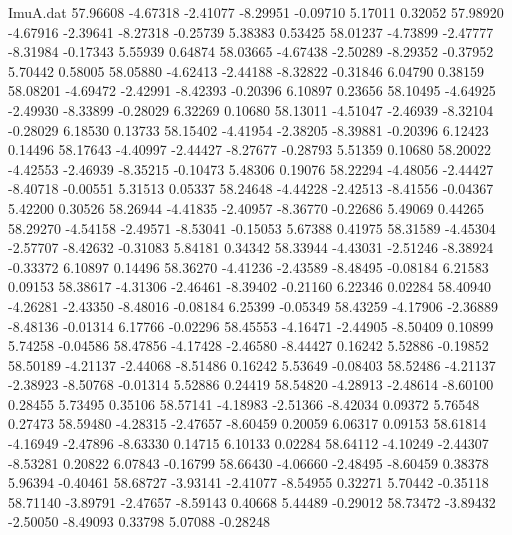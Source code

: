 \begin{filecontents}{ImuA.dat}
  57.96608   -4.67318   -2.41077   -8.29951   -0.09710    5.17011    0.32052
  57.98920   -4.67916   -2.39641   -8.27318   -0.25739    5.38383    0.53425
  58.01237   -4.73899   -2.47777   -8.31984   -0.17343    5.55939    0.64874
  58.03665   -4.67438   -2.50289   -8.29352   -0.37952    5.70442    0.58005
  58.05880   -4.62413   -2.44188   -8.32822   -0.31846    6.04790    0.38159
  58.08201   -4.69472   -2.42991   -8.42393   -0.20396    6.10897    0.23656
  58.10495   -4.64925   -2.49930   -8.33899   -0.28029    6.32269    0.10680
  58.13011   -4.51047   -2.46939   -8.32104   -0.28029    6.18530    0.13733
  58.15402   -4.41954   -2.38205   -8.39881   -0.20396    6.12423    0.14496
  58.17643   -4.40997   -2.44427   -8.27677   -0.28793    5.51359    0.10680
  58.20022   -4.42553   -2.46939   -8.35215   -0.10473    5.48306    0.19076
  58.22294   -4.48056   -2.44427   -8.40718   -0.00551    5.31513    0.05337
  58.24648   -4.44228   -2.42513   -8.41556   -0.04367    5.42200    0.30526
  58.26944   -4.41835   -2.40957   -8.36770   -0.22686    5.49069    0.44265
  58.29270   -4.54158   -2.49571   -8.53041   -0.15053    5.67388    0.41975
  58.31589   -4.45304   -2.57707   -8.42632   -0.31083    5.84181    0.34342
  58.33944   -4.43031   -2.51246   -8.38924   -0.33372    6.10897    0.14496
  58.36270   -4.41236   -2.43589   -8.48495   -0.08184    6.21583    0.09153
  58.38617   -4.31306   -2.46461   -8.39402   -0.21160    6.22346    0.02284
  58.40940   -4.26281   -2.43350   -8.48016   -0.08184    6.25399   -0.05349
  58.43259   -4.17906   -2.36889   -8.48136   -0.01314    6.17766   -0.02296
  58.45553   -4.16471   -2.44905   -8.50409    0.10899    5.74258   -0.04586
  58.47856   -4.17428   -2.46580   -8.44427    0.16242    5.52886   -0.19852
  58.50189   -4.21137   -2.44068   -8.51486    0.16242    5.53649   -0.08403
  58.52486   -4.21137   -2.38923   -8.50768   -0.01314    5.52886    0.24419
  58.54820   -4.28913   -2.48614   -8.60100    0.28455    5.73495    0.35106
  58.57141   -4.18983   -2.51366   -8.42034    0.09372    5.76548    0.27473
  58.59480   -4.28315   -2.47657   -8.60459    0.20059    6.06317    0.09153
  58.61814   -4.16949   -2.47896   -8.63330    0.14715    6.10133    0.02284
  58.64112   -4.10249   -2.44307   -8.53281    0.20822    6.07843   -0.16799
  58.66430   -4.06660   -2.48495   -8.60459    0.38378    5.96394   -0.40461
  58.68727   -3.93141   -2.41077   -8.54955    0.32271    5.70442   -0.35118
  58.71140   -3.89791   -2.47657   -8.59143    0.40668    5.44489   -0.29012
  58.73472   -3.89432   -2.50050   -8.49093    0.33798    5.07088   -0.28248

\end{filecontents}
